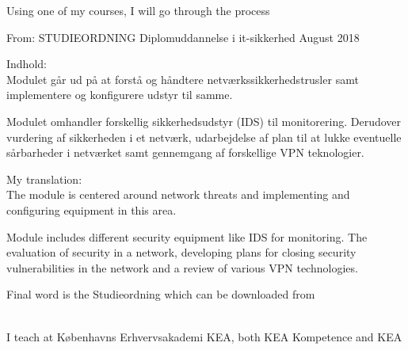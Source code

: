 \documentclass[Screen16to9,17pt]{foils}
\begin{document}


\begin{quote}

\end{quote}

\begin{list2}
\item Using one of my courses, I will go through the process
\end{list2}




From: STUDIEORDNING Diplomuddannelse i it-sikkerhed August 2018

Indhold:\\
Modulet går ud på at forstå og håndtere netværkssikkerhedstrusler samt implementere og
konfigurere udstyr til samme.

Modulet omhandler forskellig sikkerhedsudstyr (IDS) til monitorering. Derudover vurdering af sikkerheden i et netværk, udarbejdelse af plan til at lukke eventuelle sårbarheder i netværket samt gennemgang af forskellige VPN teknologier.

My translation:\\
The module is centered around network threats and implementing and configuring equipment in this area.

Module includes different security equipment like IDS for monitoring.
The evaluation of security in a network, developing plans for closing security vulnerabilities in the network and a review of various VPN technologies.

Final word is the Studieordning which can be downloaded from\\
{\footnotesize {}\\
}







I teach at Københavns Erhvervsakademi KEA, both KEA Kompetence and KEA



\end{document}
